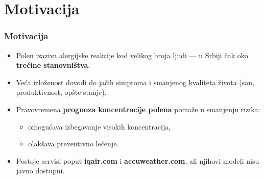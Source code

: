 \section{Motivacija}

\begin{frame}
    \frametitle{Motivacija}

    \begin{itemize}
        \item Polen izaziva alergijske reakcije kod velikog broja ljudi — u Srbiji čak oko \textbf{trećine stanovništva}.
        \item Veća izloženost dovodi do jačih simptoma i smanjenog kvaliteta života (san, produktivnost, opšte stanje).
        \item Pravovremena \textbf{prognoza koncentracije polena} pomaže u smanjenju rizika:
        \begin{itemize}
            \item omogućava izbegavanje visokih koncentracija,
            \item olakšava preventivno lečenje.
        \end{itemize}
        \item Postoje servisi poput \textbf{iqair.com} i \textbf{accuweather.com}, ali njihovi modeli nisu javno dostupni.
    \end{itemize}
\end{frame}
